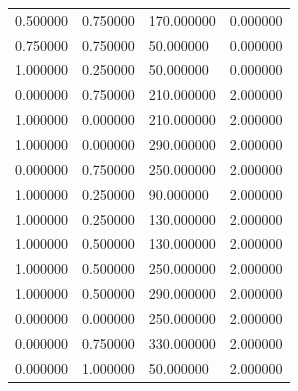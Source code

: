 \documentclass[12pt]{report}
\begin{document}
\begin{center}
\begin{table}[h!]
\begin{center}
\begin{tabular}{|llll|}
				0.500000                                              & 0.750000                   & 170.000000                & 0.000000 \\

				0.750000                                              & 0.750000                   & 50.000000                 & 0.000000 \\

				1.000000                                              & 0.250000                   & 50.000000                 & 0.000000 \\ \hline
				0.000000                                              & 0.750000                   & 210.000000                & 2.000000 \\
				1.000000                                              & 0.000000                   & 210.000000                & 2.000000 \\
				1.000000                                              & 0.000000                   & 290.000000                & 2.000000 \\
				0.000000                                              & 0.750000                   & 250.000000                & 2.000000 \\
				1.000000                                              & 0.250000                   & 90.000000                 & 2.000000 \\
				1.000000                                              & 0.250000                   & 130.000000                & 2.000000 \\
				1.000000                                              & 0.500000                   & 130.000000                & 2.000000 \\
				1.000000                                              & 0.500000                   & 250.000000                & 2.000000 \\
				1.000000                                              & 0.500000                   & 290.000000                & 2.000000 \\
				0.000000                                              & 0.000000                   & 250.000000                & 2.000000 \\
				0.000000                                              & 0.750000                   & 330.000000                & 2.000000 \\
				0.000000                                              & 1.000000                   & 50.000000                 & 2.000000 \\

\end{tabular}
\end{center}
\end{table}
\end{center}
\end{document}

